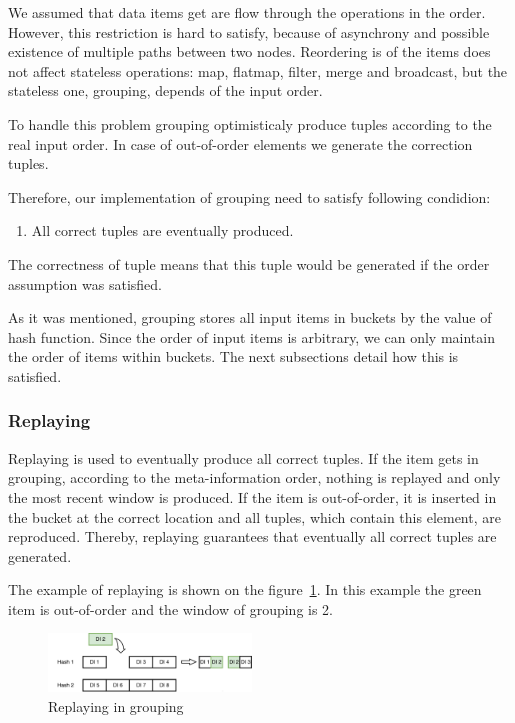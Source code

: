 \label {fs-collision}

We assumed that data items get are flow through the operations in the order. However, this restriction is hard to satisfy, because of asynchrony and possible existence of multiple paths between two nodes. Reordering is of the items does not affect stateless operations: map, flatmap, filter, merge and broadcast, but the stateless one, grouping, depends of the input order.

To handle this problem grouping optimisticaly produce tuples according to the real input order. In case of out-of-order elements we generate the correction tuples.

Therefore, our implementation of grouping need to satisfy following condidion: 

\begin{enumerate}
\item All correct tuples are eventually produced.
\end{enumerate}

The correctness of tuple means that this tuple would be generated if the order assumption was satisfied. 

As it was mentioned, grouping stores all input items in buckets by the value of hash function. Since the order of input items is arbitrary, we can only maintain the order of items within buckets. The next subsections detail how this is satisfied.

\subsubsection{Replaying}

Replaying is used to eventually produce all correct tuples. If the item gets in grouping, according to the meta-information order, nothing is replayed and only the most recent window is produced. If the item is out-of-order, it is inserted in the bucket at the correct location and all tuples, which contain this element, are reproduced. Thereby, replaying guarantees that eventually all correct tuples are generated.

The example of replaying is shown on the figure~\ref{grouping-replaying-figure}. In this example the green item is out-of-order and the window of grouping is 2.

\begin{figure}[htbp]
  \centering
  \includegraphics[width=0.48\textwidth]{pics/grouping-replaying}
  \caption{Replaying in grouping}
  \label {grouping-replaying-figure}
\end{figure}
